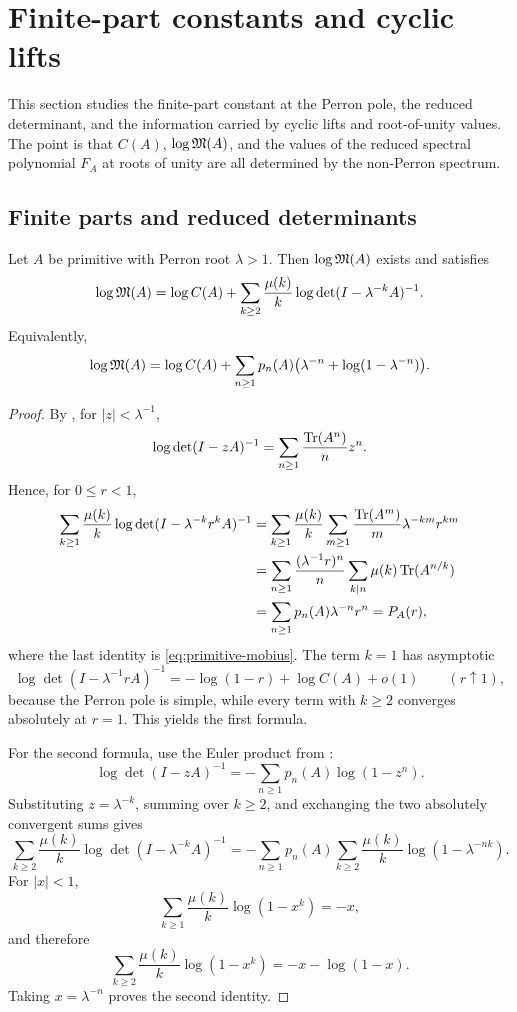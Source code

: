 \section{Finite-part constants and cyclic lifts}
\label{sec:finite-part}

This section studies the finite-part constant at the Perron pole, the
reduced determinant, and the information carried by cyclic lifts and
root-of-unity values. The point is that \(C(A)\), \(\log\mathfrak{M}(A)\), and
the values of the reduced spectral polynomial \(F_A\) at roots of unity
are all determined by the non-Perron spectrum.

\subsection{Finite parts and reduced determinants}

\begin{theorem}
  \label{thm:finite-part-primitive-closed-form}
  Let \(A\) be primitive with Perron root \(\lambda>1\). Then
  \(\log\mathfrak{M}(A)\) exists and satisfies
  \[
    \log\mathfrak{M}(A)
    =\log C(A)+\sum_{k\ge 2}\frac{\mu(k)}{k}
      \log\det(I-\lambda^{-k}A)^{-1}.
  \]
  Equivalently,
  \[
    \log\mathfrak{M}(A)
    =\log C(A)
      +\sum_{n\ge 1}p_n(A)
       \bigl(\lambda^{-n}+\log(1-\lambda^{-n})\bigr).
  \]
\end{theorem}

\begin{proof}
  By , for \(|z|<\lambda^{-1}\),
  \[
    \log\det(I-zA)^{-1}
    =\sum_{n\ge 1}\frac{\operatorname{Tr}(A^n)}{n}z^n.
  \]
  Hence, for \(0\le r<1\),
  \begin{align*}
    \sum_{k\ge 1}\frac{\mu(k)}{k}
      \log\det(I-\lambda^{-k}r^kA)^{-1}
    &=\sum_{k\ge 1}\frac{\mu(k)}{k}
      \sum_{m\ge 1}\frac{\operatorname{Tr}(A^m)}{m}\lambda^{-km}r^{km} \\
    &=\sum_{n\ge 1}\frac{(\lambda^{-1}r)^n}{n}
      \sum_{k\mid n}\mu(k)\operatorname{Tr}(A^{n/k}) \\
    &=\sum_{n\ge 1}p_n(A)\lambda^{-n}r^n
      =P_A(r),
  \end{align*}
  where the last identity is \eqref{eq:primitive-mobius}. The term
  \(k=1\) has asymptotic
  \[
    \log\det(I-\lambda^{-1}rA)^{-1}
    =-\log(1-r)+\log C(A)+o(1)
    \qquad (r\uparrow 1),
  \]
  because the Perron pole is simple, while every term with \(k\ge 2\)
  converges absolutely at \(r=1\). This yields the first formula.

  For the second formula, use the Euler product from
  :
  \[
    \log\det(I-zA)^{-1}
    =-\sum_{n\ge 1}p_n(A)\log(1-z^n).
  \]
  Substituting \(z=\lambda^{-k}\), summing over \(k\ge 2\), and
  exchanging the two absolutely convergent sums gives
  \[
    \sum_{k\ge 2}\frac{\mu(k)}{k}\log\det(I-\lambda^{-k}A)^{-1}
    =-\sum_{n\ge 1}p_n(A)
      \sum_{k\ge 2}\frac{\mu(k)}{k}\log(1-\lambda^{-nk}).
  \]
  For \(|x|<1\),
  \[
    \sum_{k\ge 1}\frac{\mu(k)}{k}\log(1-x^k)=-x,
  \]
  and therefore
  \[
    \sum_{k\ge 2}\frac{\mu(k)}{k}\log(1-x^k)=-x-\log(1-x).
  \]
  Taking \(x=\lambda^{-n}\) proves the second identity.
\end{proof}

